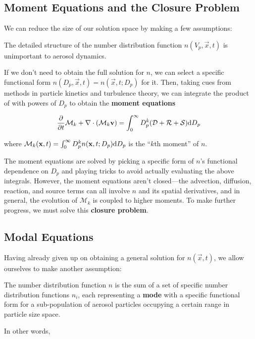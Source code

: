 \subsection*{Moment Equations and the Closure Problem}
We can reduce the size of our solution space by making a few assumptions:

\begin{assume}
  The detailed structure of the number distribution function
        $n(V_p, \vec{x}, t)$ is unimportant to aerosol dynamics.
\end{assume}

If we don't need to obtain the full solution for $n$, we can select a specific
functional form $n(D_p, \vec{x}, t) = n(\vec{x}, t; D_p)$ for it. Then, taking cues from
methods in particle kinetics and turbulence theory, we can integrate the product
of  with powers of $D_p$ to obtain the {\bf moment
equations}

\begin{equation}\labeleq{moments}
  \ddt{\mathcal{M}_k} + \div{(\mathcal{M}_k\vec{v})} = \int_0^{\infty} D_p^k (\mathcal{D} + \mathcal{R} + \mathcal{S}) \d{D_p}
\end{equation}

where $\mathcal{M}_k(\mathbf{x}, t) = \int_0^{\infty} D_p^k n(\mathbf{x}, t; D_p) \mathrm{d} D_p$
is the ``$k$th moment'' of $n$.

The moment equations are solved by picking a specific form of $n$'s functional
dependence on $D_p$ and playing tricks to avoid actually evaluating the
above integrals. However, the moment equations aren't closed---the advection,
diffusion, reaction, and source terms can all involve $n$ and its spatial
derivatives, and in general, the evolution of $\mathcal{M}_k$ is coupled to higher
moments. To make further progress, we must solve this {\bf closure problem}.

\subsection*{Modal Equations}

Having already given up on obtaining a general solution for $n(\vec{x}, t)$,
we allow ourselves to make another assumption:

\begin{assume}
  The number distribution function $n$ is the sum of a set of
        specific number distribution functions $n_i$, each representing a
        {\bf mode} with a specific functional form for a sub-population of
        aerosol particles occupying a certain range in particle size space.
\end{assume}
In other words,

